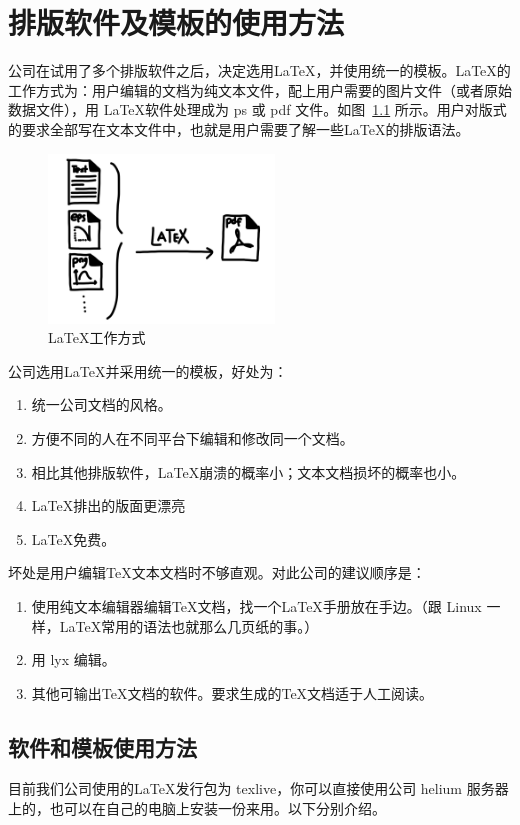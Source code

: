\chapter{排版软件及模板的使用方法}
公司在试用了多个排版软件之后，决定选用\LaTeX ，并使用统一的模板。\LaTeX 的工作方式为：用户编辑的文档为纯文本文件，配上用户需要的图片文件（或者原始数据文件），用 \LaTeX 软件处理成为 ps 或 pdf 文件。如图~\ref{latex} 所示。用户对版式的要求全部写在文本文件中，也就是用户需要了解一些\LaTeX 的排版语法。

\begin{figure}[htbp]\centering
\includegraphics[width=6cm]{latex_zj.jpg} 
\caption{\label{latex}\LaTeX 工作方式}
\end{figure}

公司选用\LaTeX 并采用统一的模板，好处为：
\begin{enumerate}
\item 统一公司文档的风格。
\item 方便不同的人在不同平台下编辑和修改同一个文档。
\item 相比其他排版软件，\LaTeX 崩溃的概率小；文本文档损坏的概率也小。
\item \LaTeX 排出的版面更漂亮
\item \LaTeX 免费。
\end{enumerate}
坏处是用户编辑\TeX 文本文档时不够直观。对此公司的建议顺序是：
\begin{enumerate}
\item 使用纯文本编辑器编辑\TeX 文档，找一个\LaTeX 手册放在手边。（跟 Linux 一样，\LaTeX 常用的语法也就那么几页纸的事\cite{oetiker1995not}。）
\item 用 lyx 编辑。
\item 其他可输出\TeX 文档的软件。要求生成的\TeX 文档适于人工阅读。
\end{enumerate}

\section{软件和模板使用方法}
目前我们公司使用的\LaTeX 发行包为 texlive，你可以直接使用公司 helium 服务器上的，也可以在自己的电脑上安装一份来用。以下分别介绍。

